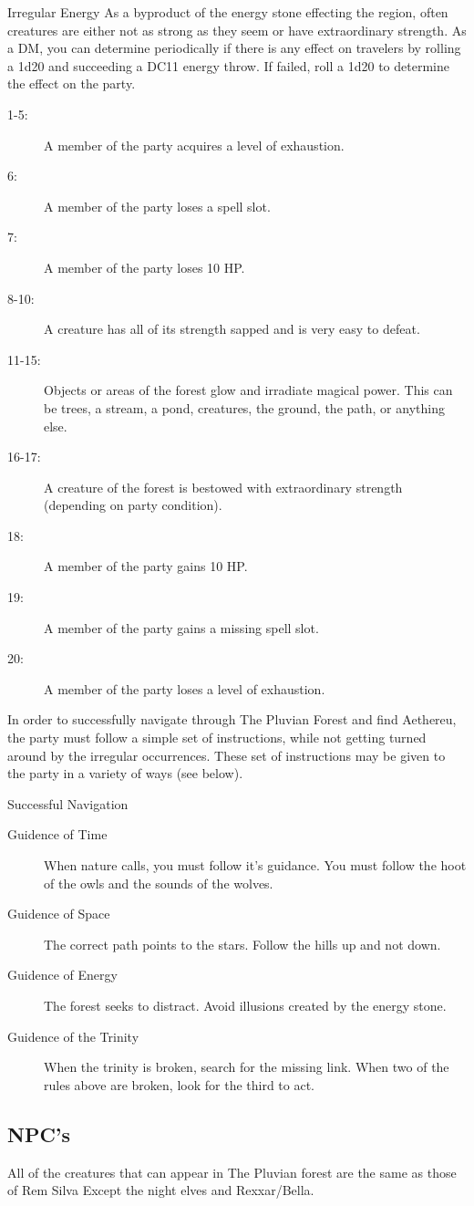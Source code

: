 \begin{commentbox}{Irregular Energy}
	As a byproduct of the energy stone effecting the region, often creatures are either not as strong as they seem or have extraordinary strength. As a DM, you can determine periodically if there is any effect on travelers by rolling a 1d20 and succeeding a DC11 energy throw. If failed, roll a 1d20 to determine the effect on the party.
	\hline
	\begin{description}
		\item[1-5:] A member of the party acquires a level of exhaustion.
		\item[6:] A member of the party loses a spell slot.
		\item[7:] A member of the party loses 10 HP.
		\item[8-10:] A creature has all of its strength sapped and is very easy to defeat.
		\item[11-15:] Objects or areas of the forest glow and irradiate magical power. This can be trees, a stream, a pond, creatures, the ground, the path, or anything else. 
		\item[16-17:] A creature of the forest is bestowed with extraordinary strength (depending on party condition).
		\item[18:] A member of the party gains 10 HP. 
		\item[19:] A member of the party gains a missing spell slot. 
		\item[20:] A member of the party loses a level of exhaustion.
	\end{description}
\end{commentbox}

In order to successfully navigate through The Pluvian Forest and find Aethereu, the party must follow a simple set of instructions, while not getting turned around by the irregular occurrences. These set of instructions may be given to the party in a variety of ways (see below). 

\begin{commentbox}{Successful Navigation}
	\begin{description}
		\item[Guidence of Time] When nature calls, you must follow it's guidance. You must follow the hoot of the owls and the sounds of the wolves.
		\item[Guidence of Space] The correct path points to the stars. Follow the hills up and not down.
		\item[Guidence of Energy] The forest seeks to distract. Avoid illusions created by the energy stone.
		\item[Guidence of the Trinity] When the trinity is broken, search for the missing link. When two of the rules above are broken, look for the third to act.
	\end{description}
\end{commentbox}

\subsection{NPC's}
All of the creatures that can appear in The Pluvian forest are the same as those of Rem Silva Except the night elves and Rexxar/Bella.